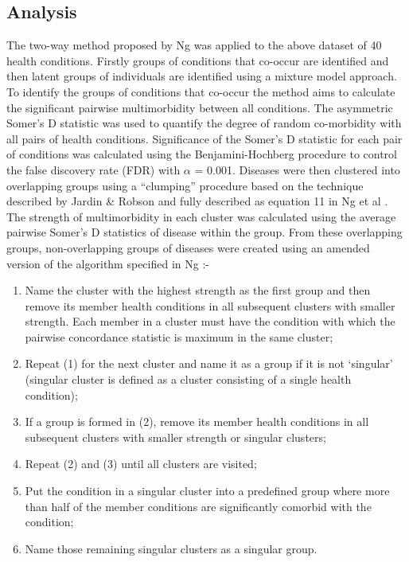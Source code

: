 \documentclass[12pt,]{report}
\providecommand{\tightlist}{%
  \setlength{\itemsep}{0pt}\setlength{\parskip}{0pt}}
\begin{document}
\subsection{Analysis}\label{subsec:clust-analysis}

The two-way method proposed by Ng \citeyearpar{RN72} was applied to the
above dataset of 40 health conditions. Firstly groups of conditions that
co-occur are identified and then latent groups of individuals are
identified using a mixture model approach. To identify the groups of
conditions that co-occur the method aims to calculate the significant
pairwise multimorbidity between all conditions. The asymmetric Somer's D
statistic was used to quantify the degree of random co-morbidity with
all pairs of health conditions. Significance of the Somer's D statistic
for each pair of conditions was calculated using the Benjamini-Hochberg
procedure \citep{RN293} to control the false discovery rate (FDR) with
\(\alpha\) = 0.001. Diseases were then clustered into overlapping groups
using a ``clumping'' procedure based on the technique described by
Jardin \& Robson \citeyearpar{RN294} and fully described as equation 11
in Ng et al \citeyearpar{RN225}. The strength of multimorbidity in each
cluster was calculated using the average pairwise Somer's D statistics
of disease within the group. From these overlapping groups,
non-overlapping groups of diseases were created using an amended version
of the algorithm specified in Ng \citeyearpar{RN72}:-

\begin{enumerate}
\def\labelenumi{\arabic{enumi}.}
\tightlist
\item
  Name the cluster with the highest strength as the first group and then
  remove its member health conditions in all subsequent clusters with
  smaller strength. Each member in a cluster must have the condition
  with which the pairwise concordance statistic is maximum in the same
  cluster;
\item
  Repeat (1) for the next cluster and name it as a group if it is not
  `singular' (singular cluster is defined as a cluster consisting of a
  single health condition);\\
\item
  If a group is formed in (2), remove its member health conditions in
  all subsequent clusters with smaller strength or singular clusters;
\item
  Repeat (2) and (3) until all clusters are visited;
\item
  Put the condition in a singular cluster into a predefined group where
  more than half of the member conditions are significantly comorbid
  with the condition;
\item
  Name those remaining singular clusters as a singular group.
\end{enumerate}
\end{document}
